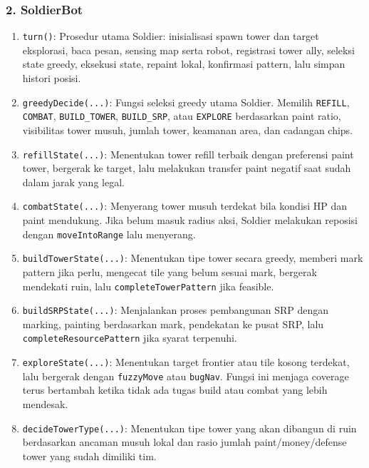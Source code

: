 \subsubsection{2. SoldierBot}
\begin{enumerate}
	\item \texttt{turn()}:
	      Prosedur utama Soldier: inisialisasi spawn tower dan target eksplorasi, baca pesan, sensing map serta robot, registrasi tower ally, seleksi state greedy, eksekusi state, repaint lokal, konfirmasi pattern, lalu simpan histori posisi.

	\item \texttt{greedyDecide(...)}:
	      Fungsi seleksi greedy utama Soldier. Memilih \texttt{REFILL}, \texttt{COMBAT}, \texttt{BUILD\_TOWER}, \texttt{BUILD\_SRP}, atau \texttt{EXPLORE} berdasarkan paint ratio, visibilitas tower musuh, jumlah tower, keamanan area, dan cadangan chips.

	\item \texttt{refillState(...)}:
	      Menentukan tower refill terbaik dengan preferensi paint tower, bergerak ke target, lalu melakukan transfer paint negatif saat sudah dalam jarak yang legal.

	\item \texttt{combatState(...)}:
	      Menyerang tower musuh terdekat bila kondisi HP dan paint mendukung. Jika belum masuk radius aksi, Soldier melakukan reposisi dengan \texttt{moveIntoRange} lalu menyerang.

	\item \texttt{buildTowerState(...)}:
	      Menentukan tipe tower secara greedy, memberi mark pattern jika perlu, mengecat tile yang belum sesuai mark, bergerak mendekati ruin, lalu \texttt{completeTowerPattern} jika feasible.

	\item \texttt{buildSRPState(...)}:
	      Menjalankan proses pembangunan SRP dengan marking, painting berdasarkan mark, pendekatan ke pusat SRP, lalu \texttt{completeResourcePattern} jika syarat terpenuhi.

	\item \texttt{exploreState(...)}:
	      Menentukan target frontier atau tile kosong terdekat, lalu bergerak dengan \texttt{fuzzyMove} atau \texttt{bugNav}. Fungsi ini menjaga coverage terus bertambah ketika tidak ada tugas build atau combat yang lebih mendesak.

	\item \texttt{decideTowerType(...)}:
	      Menentukan tipe tower yang akan dibangun di ruin berdasarkan ancaman musuh lokal dan rasio jumlah paint/money/defense tower yang sudah dimiliki tim.


\end{enumerate}
